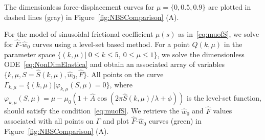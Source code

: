 The dimensionless force-displacement curves for $\mu = \{0, 0.5, 0.9\}$ are plotted in dashed lines (gray) in Figure~\ref{fig:NBSComparison} (\textsf{A}).

For the model of sinusoidal frictional coefficient $\mu(s)$ as in~\eqref{eq:muofS}, we solve for $\hat{F}$-$\hat{w}_0$ curves using a level-set based method.
For a point $Q(k,\mu)$ in the parameter space $\{(k,\mu) |\  0\leq k\leq 5,\  0\leq \mu \leq 1\}$, we solve the dimensionless ODE~\eqref{eq:NonDimElastica} and obtain an associated array of variables $\{k ,\mu, S = \hat{S}(k,\mu), \hat{w}_0, \hat{F}\}$.
%
All points on the curve $\Gamma_{k,\mu} = \{ (k,\mu) | \varphi_{k,\mu}(S,\mu)  = 0\}$, where $\varphi_{k,\mu}(S,\mu) = \mu - \mu_0 \left( 1 + \hat{A} \cos\left(2 \pi \hat{S}(k,\mu)/\lambda + \phi \right)\right)$ is the level-set function, should satisfy the condition~\eqref{eq:muofS}.
We retrieve the $\hat{w}_0$ and $\hat{F}$ values associated with all points on $\Gamma$ and plot $\hat{F}$-$\hat{w}_0$ curves (green) in Figure~\ref{fig:NBSComparison} (\textsf{A}).

\clearpage
